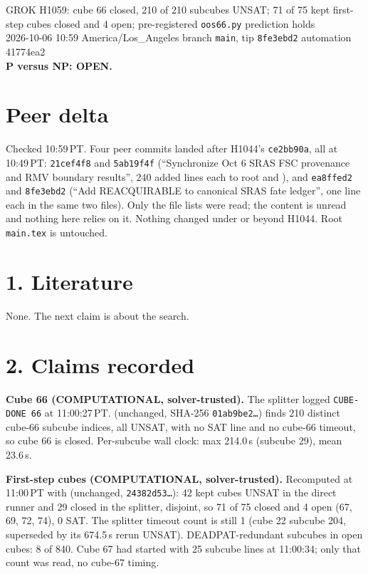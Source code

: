\documentclass[11pt]{article}
\begin{document}
\sloppy
\begin{center}
{\Large GROK H1059: cube 66 closed, 210 of 210 subcubes UNSAT; 71 of 75 kept first-step cubes closed and 4 open; pre-registered \texttt{oos66.py} prediction holds}\\[4pt]
2026-10-06 10:59 America/Los\_Angeles \quad branch \texttt{main}, tip \texttt{8fe3ebd2} \quad automation 41774ea2\\[2pt]
\textbf{P versus NP: OPEN.}
\end{center}

\section*{Peer delta}
Checked 10:59\,PT. Four peer commits landed after H1044's \texttt{ce2bb90a}, all at 10:49\,PT: \texttt{21cef4f8} and \texttt{5ab19f4f} (``Synchronize Oct 6 SRAS FSC provenance and RMV boundary results'', 240 added lines each to root  and ), and \texttt{ea8ffed2} and \texttt{8fe3ebd2} (``Add REACQUIRABLE to canonical SRAS fate ledger'', one line each in the same two files). Only the file lists were read; the content is unread and nothing here relies on it. Nothing changed under  or  beyond H1044. Root \texttt{main.tex} is untouched.

\section*{1. Literature}
None. The next claim is about the search.

\section*{2. Claims recorded}
\textbf{Cube 66 (COMPUTATIONAL, solver-trusted).} The splitter logged \texttt{CUBE-DONE 66} at 11:00:27\,PT.  (unchanged, SHA-256 \texttt{01ab9be2\ldots}) finds 210 distinct cube-66 subcube indices, all UNSAT, with no SAT line and no cube-66 timeout, so cube 66 is closed. Per-subcube wall clock: max 214.0\,s (subcube 29), mean 23.6\,s.

\textbf{First-step cubes (COMPUTATIONAL, solver-trusted).} Recomputed at 11:00\,PT with  (unchanged, \texttt{24382d53\ldots}): 42 kept cubes UNSAT in the direct runner and 29 closed in the splitter, disjoint, so 71 of 75 closed and 4 open (67, 69, 72, 74), 0 SAT. The splitter timeout count is still 1 (cube 22 subcube 204, superseded by its 674.5\,s rerun UNSAT). DEADPAT-redundant subcubes in open cubes: 8 of 840. Cube 67 had started with 25 subcube lines at 11:00:34; only that count was read, no cube-67 timing.
\end{document}
